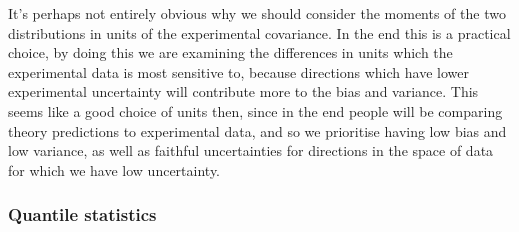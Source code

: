 It's perhaps not entirely obvious why we should consider the moments of the two
distributions in units of the experimental covariance. In the end this is a
practical choice, by doing this we are examining the differences in units which
the experimental data is most sensitive to, because directions which have lower
experimental uncertainty will contribute more to the bias and variance. This
seems like a good choice of units then, since in the end people will be comparing
theory predictions to experimental data, and so we prioritise having low bias
and low variance, as well as faithful uncertainties for directions in the space
of data for which we have low uncertainty.

\subsubsection{Quantile statistics}

